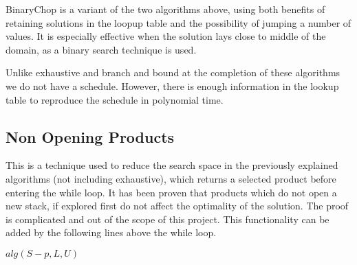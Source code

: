 BinaryChop is a variant of the two algorithms above, using both benefits of
retaining solutions in the loopup table and the possibility of jumping a number
of values. It is especially effective when the solution lays close to middle of
the domain, as a binary search technique is used. 

Unlike exhaustive and branch and bound at the completion of these
algorithms we do not have a schedule. However, there is enough information in
the lookup table to reproduce the schedule in polynomial time.

\subsection{Non Opening Products}

This is a technique used to reduce the search space in the previously explained
algorithms (not including exhaustive), which returns a selected product before
entering the while loop. It has been proven that products which do not open a
new stack, if explored first do not affect the optimality of the solution. The
proof is complicated and out of the scope of this project. This functionality can be added by the following lines above the while loop.
\\
\begin{algorithmic}
\STATE $alg(S-{p},L,U)$
\ENDIF
\end{algorithmic}

